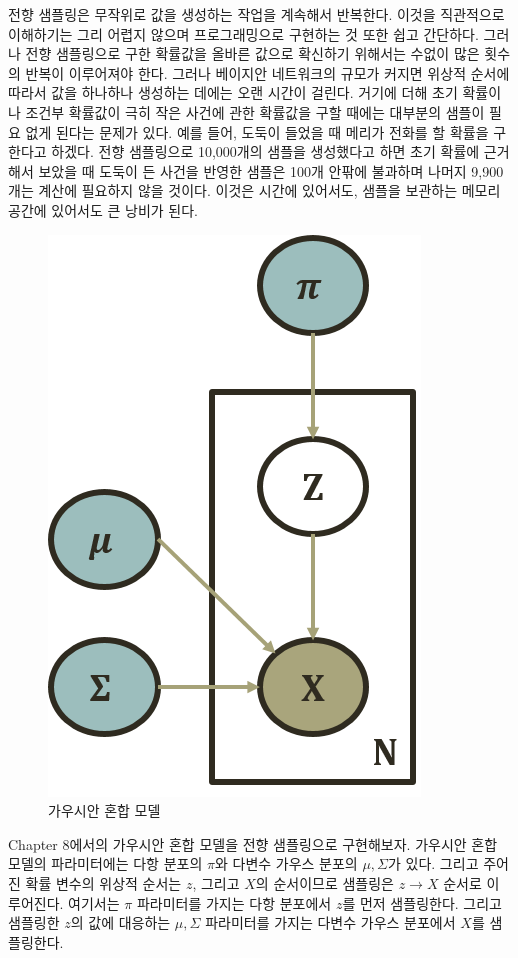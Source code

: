 \documentclass[a4paper]{oblivoir}
\begin{document}
전향 샘플링은 무작위로 값을 생성하는 작업을 계속해서 반복한다. 이것을 직관적으로 이해하기는 그리 어렵지 않으며 프로그래밍으로 구현하는 것 또한 쉽고 간단하다. 그러나 전향 샘플링으로 구한 확률값을 올바른 값으로 확신하기 위해서는 수없이 많은 횟수의 반복이 이루어져야 한다. 그러나 베이지안 네트워크의 규모가 커지면 위상적 순서에 따라서 값을 하나하나 생성하는 데에는 오랜 시간이 걸린다. 거기에 더해 초기 확률이나 조건부 확률값이 극히 작은 사건에 관한 확률값을 구할 때에는 대부분의 샘플이 필요 없게 된다는 문제가 있다. 예를 들어, 도둑이 들었을 때 메리가 전화를 할 확률을 구한다고 하겠다. 전향 샘플링으로 10,000개의 샘플을 생성했다고 하면 초기 확률에 근거해서 보았을 때 도둑이 든 사건을 반영한 샘플은 100개 안팎에 불과하며 나머지 9,900개는 계산에 필요하지 않을 것이다. 이것은 시간에 있어서도, 샘플을 보관하는 메모리 공간에 있어서도 큰 낭비가 된다.   \\

\begin{figure}[ht] \centering 
\includegraphics[scale=0.45]{fig10_2.png} 
\caption{가우시안 혼합 모델}
\label{fig:10-2}
\end{figure} 

Chapter 8에서의 가우시안 혼합 모델을 전향 샘플링으로 구현해보자. 가우시안 혼합 모델의 파라미터에는 다항 분포의 $\pi$와 다변수 가우스 분포의 $\mu, \Sigma$가 있다. 그리고 주어진 확률 변수의 위상적 순서는 $z$, 그리고 $X$의 순서이므로 샘플링은 $z \to X$ 순서로 이루어진다. 여기서는 $\pi$ 파라미터를 가지는 다항 분포에서 $z$를 먼저 샘플링한다. 그리고 샘플링한 $z$의 값에 대응하는 $\mu, \Sigma$ 파라미터를 가지는 다변수 가우스 분포에서 $X$를 샘플링한다. \\
\end{document}
